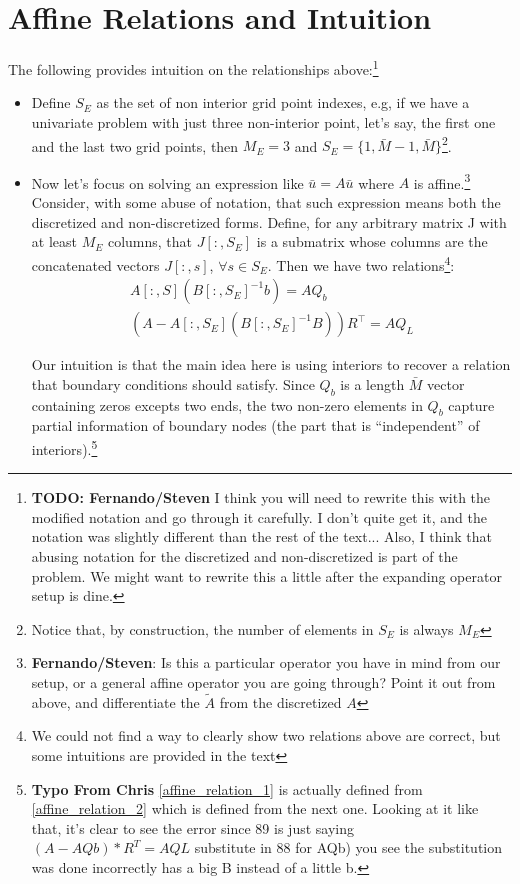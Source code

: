\documentclass[11pt]{article}
\begin{document}
\section{Affine Relations and Intuition}
The following provides intuition on the relationships above:\footnote{\textbf{TODO: Fernando/Steven} I think you will need to rewrite this with the modified notation and go through it carefully.  I don't quite get it, and the notation was slightly different than the rest of the text...  Also, I think that abusing notation for the discretized and non-discretized is part of the problem.  We might want to rewrite this a little after the expanding operator setup is dine.}
\begin{itemize}
\item Define $S_E$ as the set of non interior grid point indexes, e.g, if we have a univariate problem with just three non-interior point, let's say, the first one and the last two grid points, then $M_E = 3$ and $S_E = \{1,\bar{M}-1,\bar{M}\}$\footnote{Notice that, by construction, the number of elements in $S_E$ is always $M_E$}.
	\item Now let's focus on solving an expression like $\bar{u} = A \bar{u}$ where $A$ is affine.\footnote{\textbf{Fernando/Steven}: Is this a particular operator you have in mind from our setup, or a general affine operator you are going through?  Point it out from above, and differentiate the $\tilde{A}$ from the discretized $A$} Consider, with some abuse of notation, that such expression means both the discretized and non-discretized forms. Define, for any arbitrary matrix J with at least $M_E$ columns, that $J[:,S_E]$ is a submatrix whose columns are the concatenated vectors $J[:,s]$, $\forall s \in S_E$.
	Then we have two relations\footnote{We could not find a way to clearly show two relations above are correct, but some intuitions are provided in the text}:
	\begin{align}
	A [:,S] \left(B[:,S_E]^{-1} b \right) = A  Q_b\label{affine_relation_1}\\
	(A -A [:,S_E] (B[:,S_E]^{-1} B)) R^{\top} = A  Q_L\label{affine_relation_2}
	\end{align}

	Our intuition is that the main idea here is using interiors to recover a relation that boundary conditions should satisfy. Since $Q_b$ is a length $\bar{M}$ vector containing zeros excepts two ends, the two non-zero elements in $Q_b$ capture partial information of boundary nodes (the part that is ``independent'' of interiors).\footnote{\textbf{Typo From Chris}
		\cref{affine_relation_1} is actually defined from \cref{affine_relation_2} which is defined from the next one.  Looking at it like that, it's clear to see the error
		since 89 is just saying
		$(A - AQb)*R^T = AQL$
		substitute in 88 for AQb)
		you see the substitution was done incorrectly
		has a big B instead of a little b.
	}
	

\end{itemize}
\end{document}
